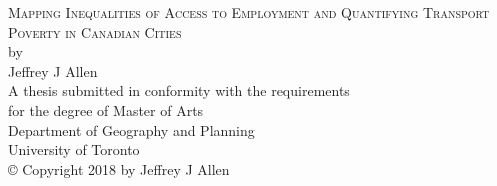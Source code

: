 \documentclass[11 pt, letterpaper]{article}
\begin{document}
	
{\begin{titlepage}
		\large
		\singlespacing
		\begin{center}
			\mbox{}
			\vfill
			\textsc{Mapping Inequalities of Access to Employment and Quantifying Transport Poverty in Canadian Cities}\\
			\vfill
			by \\
			\vfill
			{Jeffrey J Allen}\\
			\vfill
			\vfill
			A thesis submitted in conformity with the requirements \\
			for the degree of Master of Arts  \\
			Department of Geography and Planning \\
			University of Toronto \\
			\vfill
			{\copyright} Copyright 2018 by Jeffrey J Allen\\
			\vspace{.01\textheight}
			\mbox{}
		\end{center}
		\setcounter{page}{1}
	\end{titlepage}
	\setcounter{page}{2}}






\renewcommand{\thepage}{\roman{page}}%

\newpage
\end{document}
